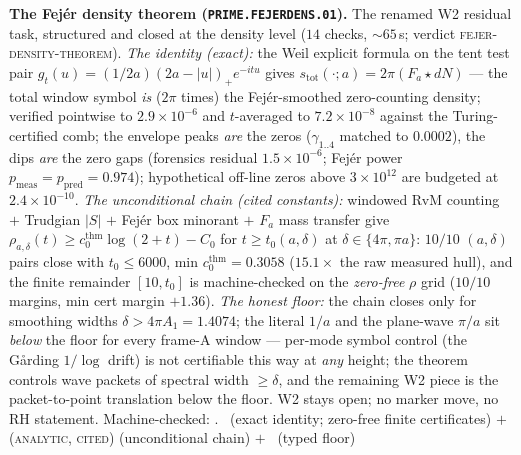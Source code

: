 \par\smallskip\noindent\textbf{The Fej\'er density theorem
(\texttt{PRIME.FEJERDENS.01}).}
The renamed W2 residual task, structured and closed at the density
level ($14$ checks, ${\sim}65$\,s; verdict
\textsc{fejer-density-theorem}).  \emph{The identity (exact):} the
Weil explicit formula on the tent test pair
$g_t(u)=(1/2a)(2a-|u|)_+e^{-itu}$ gives
$s_{\mathrm{tot}}(\cdot;a)=2\pi(F_a\star dN)$ --- the total window
symbol \emph{is} ($2\pi$ times) the Fej\'er-smoothed zero-counting
density; verified pointwise to $2.9\times10^{-6}$ and $t$-averaged
to $7.2\times10^{-8}$ against the Turing-certified comb; the
envelope peaks \emph{are} the zeros ($\gamma_{1..4}$ matched to
$0.0002$), the dips \emph{are} the zero gaps (forensics residual
$1.5\times10^{-6}$; Fej\'er power
$p_{\mathrm{meas}}=p_{\mathrm{pred}}=0.974$); hypothetical off-line
zeros above $3\times10^{12}$ are budgeted at $2.4\times10^{-10}$.
\emph{The unconditional chain (cited constants):} windowed RvM
counting $+$ Trudgian $|S|$ $+$ Fej\'er box minorant $+$ $F_a$ mass
transfer give
$\rho_{a,\delta}(t)\ge c_0^{\mathrm{thm}}\log(2+t)-C_0$ for
$t\ge t_0(a,\delta)$ at $\delta\in\{4\pi,\pi a\}$: $10/10$
$(a,\delta)$ pairs close with $t_0\le6000$, min
$c_0^{\mathrm{thm}}=0.3058$ ($15.1\times$ the raw measured hull),
and the finite remainder $[10,t_0]$ is machine-checked on the
\emph{zero-free} $\rho$ grid ($10/10$ margins, min cert margin
$+1.36$).  \emph{The honest floor:} the chain closes only for
smoothing widths $\delta>4\pi A_1=1.4074$; the literal $1/a$ and the
plane-wave $\pi/a$ sit \emph{below} the floor for every frame-A
window --- per-mode symbol control (the G\aa rding $1/\log$ drift)
is not certifiable this way at \emph{any} height; the theorem
controls wave packets of spectral width $\ge\delta$, and the
remaining W2 piece is the packet-to-point translation below the
floor.  W2 stays open; no marker move, no RH statement.
Machine-checked: .
\mE\ (exact identity; zero-free finite certificates) $+$
(\textsc{analytic, cited}) (unconditional chain) $+$ \mC\ (typed
floor)
\par\smallskip


